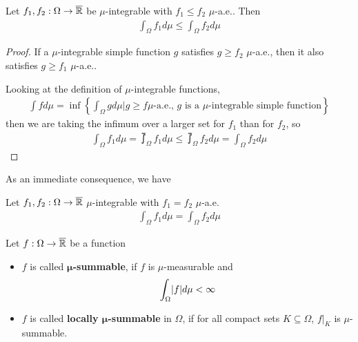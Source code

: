 \begin{prop}[Monotonicity]\label{prop:monotonicity-integral}
  Let $f_1,f_2: \Omega \to \overline{\mathbb{R}}$ be $\mu$-integrable with $f_1 \leq f_2$ $\mu$-a.e.. Then
  \begin{align*}
    \int_{\Omega} f_1 d \mu \leq \int_{\Omega} f_2 d \mu
  \end{align*}
\end{prop}
\begin{proof}
  If a $\mu$-integrable simple function $g$ satisfies $g \geq f_2$ $\mu$-a.e., then it also satisfies $g \geq f_1$ $\mu$-a.e..

  Looking at the definition of $\mu$-integrable functions, 
  \begin{align*}
    \int f d \mu = 
      \inf \left\{
        \int_{\Omega}g d \mu
        \big\vert g \geq f \mu\text{-a.e., $g$ is a $\mu$-integrable simple function}
      \right\}
  \end{align*}
  then we are taking the infimum over a larger set for $f_1$ than for $f_2$, so 
  \begin{align*}
    \int_{\Omega}f_1 d \mu 
    =
    \upint_{\Omega}f_1 d \mu
    \leq
    \upint_{\Omega}f_2 d \mu
    = \int_{\Omega}f_2 d \mu
  \end{align*}
\end{proof}
As an immediate consequence, we have
\begin{cor}[]
  Let $f_1,f_2: \Omega \to \overline{\mathbb{R}}$ $\mu$-integrable with $f_1 = f_2$ $\mu$-a.e.
  \begin{align*}
    \int_{\Omega} f_1 d \mu = \int_{\Omega} f_2 d \mu
  \end{align*}
\end{cor}
\begin{dfn}[]
  Let $f: \Omega \to \overline{\mathbb{R}}$ be a function
  \begin{itemize}
    \item $f$ is called \textbf{$\bm{\mu}$-summable}, if $f$ is $\mu$-measurable and
      \begin{align*}
        \int_{\Omega} \abs{f} d \mu < \infty
      \end{align*}
    \item $f$ is called \textbf{locally $\bm{\mu}$-summable} in $\Omega$, if for all compact sets $K \subseteq \Omega$, $f|_K$ is $\mu$-summable.
  \end{itemize}
\end{dfn}


